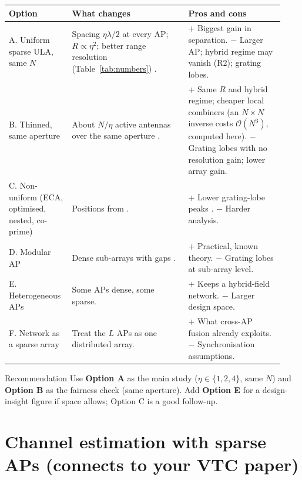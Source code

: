 \documentclass[11pt]{article}
\begin{document}
\begin{longtable}{@{}p{0.2\linewidth}p{0.4\linewidth}p{0.33\linewidth}@{}}
\toprule
\textbf{Option} & \textbf{What changes} & \textbf{Pros and cons}\\
\midrule
\endhead
A. Uniform sparse ULA, same $N$ & Spacing $\eta\lambda/2$ at every AP; $R\propto\eta^2$; better range resolution (Table~\ref{tab:numbers}) \cite{zhou2025sparse,wang2024sparsemimo}. & + Biggest gain in separation. $-$ Larger AP; hybrid regime may vanish (R2); grating lobes.\\
B. Thinned, same aperture & About $N/\eta$ active antennas over the same aperture \cite{hussain2026thinning}. & + Same $R$ and hybrid regime; cheaper local combiners (an $N\times N$ inverse costs $\mathcal O(N^3)$, computed here). $-$ Grating lobes with no resolution gain; lower array gain.\\
C. Non-uniform (ECA, optimised, nested, co-prime) & Positions from \cite{zhou2025sparse,chen2024nearfield,pal2010nested,vaidyanathan2011coprime,moffet1968mra}. & + Lower grating-lobe peaks \cite{zhou2025sparse,chen2024nearfield}. $-$ Harder analysis.\\
D. Modular AP & Dense sub-arrays with gaps \cite{li2023modular,kosasih2025mla}. & + Practical, known theory. $-$ Grating lobes at sub-array level.\\
E. Heterogeneous APs & Some APs dense, some sparse. & + Keeps a hybrid-field network. $-$ Larger design space.\\
F. Network as a sparse array & Treat the $L$ APs as one distributed array. & + What cross-AP fusion already exploits. $-$ Synchronisation assumptions.\\
\bottomrule
\end{longtable}

\begin{keybox}{Recommendation}
Use \textbf{Option A} as the main study ($\eta\in\{1,2,4\}$, same $N$) and \textbf{Option B} as the fairness check (same aperture). Add \textbf{Option E} for a design-insight figure if space allows; Option C is a good follow-up.
\end{keybox}

\section{Channel estimation with sparse APs (connects to your VTC paper)}
\label{sec:est}
\end{document}
